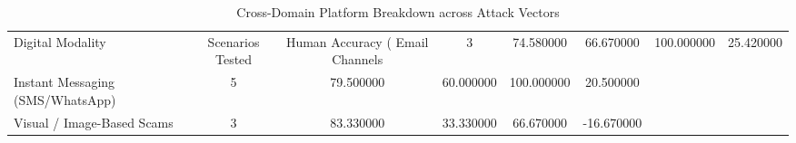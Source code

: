 \begin{table}
\caption{Cross-Domain Platform Breakdown across Attack Vectors}
\label{tab:platform_breakdown}
\begin{tabular}{lccccc}
\toprule
Digital Modality & Scenarios Tested & Human Accuracy (%
\midrule
Email Channels & 3 & 74.580000 & 66.670000 & 100.000000 & 25.420000 \\
Instant Messaging (SMS/WhatsApp) & 5 & 79.500000 & 60.000000 & 100.000000 & 20.500000 \\
Visual / Image-Based Scams & 3 & 83.330000 & 33.330000 & 66.670000 & -16.670000 \\
\bottomrule
\end{tabular}
\end{table}
